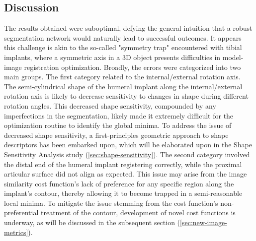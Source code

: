 \subsection{Discussion}
The results obtained were suboptimal, defying the general intuition that a robust segmentation network would naturally lead to successful outcomes.
It appears this challenge is akin to the so-called "symmetry trap" encountered with tibial implants, where a symmetric axis in a 3D object presents difficulties in model-image registration optimization.
Broadly, the errors were categorized into two main groups.
The first category related to the internal/external rotation axis.
The semi-cylindrical shape of the humeral implant along the internal/external rotation axis is likely to decrease sensitivity to changes in shape during different rotation angles.
This decreased shape sensitivity, compounded by any imperfections in the segmentation, likely made it extremely difficult for the optimization routine to identify the global minima.
To address the issue of decreased shape sensitivity, a first-principles geometric approach to shape descriptors has been embarked upon, which will be elaborated upon in the Shape Sensitivity Analysis study (\cref{sec:shape-sensitivity}).
The second category involved the distal end of the humeral implant registering correctly, while the proximal articular surface did not align as expected. This issue may arise from the image similarity cost function's lack of preference for any specific region along the implant's contour, thereby allowing it to become trapped in a semi-reasonable local minima.
To mitigate the issue stemming from the cost function's non-preferential treatment of the contour, development of novel cost functions is underway, as will be discussed in the subsequent section (\cref{sec:new-image-metrics}).

